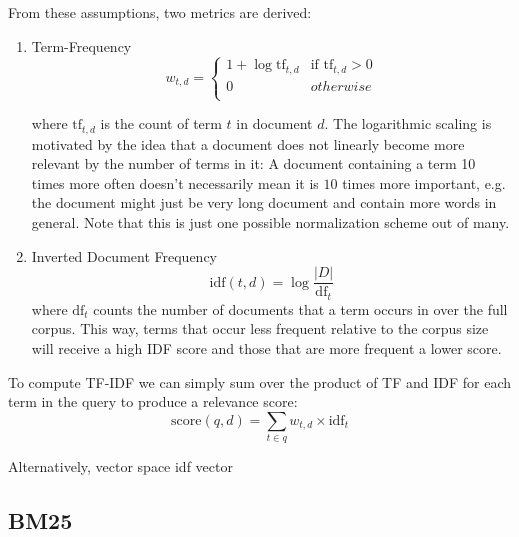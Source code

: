 From these assumptions, two metrics are derived:
\begin{enumerate}
    \item Term-Frequency
          \begin{equation}
              w_{t,d} = \begin{cases}
                  1 + \log \text{tf}_{t, d} & \text{if } \text{tf}_{t, d} > 0 \\
                  0                         & otherwise                       \\
              \end{cases}
          \end{equation}

          where $\text{tf}_{t, d}$ is the count of term $t$ in document $d$. The logarithmic scaling is motivated by the idea that a document does not linearly become more relevant by the number of terms in it: A document containing a term 10 times more often doesn't necessarily mean it is $10$ times more important, e.g. the document might just be very long document and contain more words in general. Note that this is just one possible normalization scheme out of many.

    \item Inverted Document Frequency
          \begin{equation}
              \text{idf}(t, d) = \log \frac{|D|}{\text{df}_t}
          \end{equation}
          where $\text{df}_t$ counts the number of documents that a term occurs in over the full corpus. This way, terms that occur less frequent relative to the corpus size will receive a high IDF score and those that are more frequent a lower score.

\end{enumerate}

\begin{table}

\end{table}
To compute TF-IDF we can simply sum over the product of TF and IDF for each term in the query to produce a relevance score:
\begin{equation}
    \text{score}(q, d) = \sum_{t \in q} w_{t,d} \times \text{idf}_t
\end{equation}

Alternatively, vector space idf vector
\subsection{BM25}


